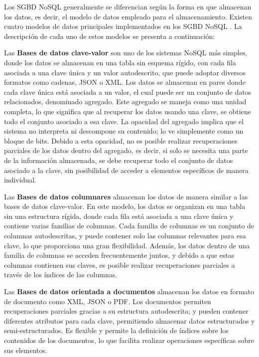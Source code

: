 Los SGBD NoSQL generalmente se diferencian según la forma en que almacenan los datos, 
es decir, el modelo de datos empleado para el almacenamiento. Existen cuatro modelos 
de datos principales implementados en los SGBD NoSQL \cite{Oliveira2021}. La descripción de 
cada uno de estos modelos se presenta a continuación:

Las \textbf{Bases de datos clave-valor} son uno de los sistemas NoSQL más simples, 
donde los datos se almacenan en una tabla sin esquema rígido, con cada fila asociada 
a una clave única y un valor autodescrito, que puede adoptar diversos formatos como 
cadenas, JSON o XML. Los datos se almacenan en pares donde cada clave única está 
asociada a un valor, el cual puede ser un conjunto de datos relacionados, denominado 
agregado. Este agregado se maneja como una unidad completa, lo que significa que al 
recuperar los datos usando una clave, se obtiene todo el conjunto asociado a esa clave. 
La opacidad del agregado implica que el sistema no interpreta ni descompone su contenido; 
lo ve simplemente como un bloque de bits. Debido a esta opacidad, no es posible realizar 
recuperaciones parciales de los datos dentro del agregado, es decir, si solo se necesita 
una parte de la información almacenada, se debe recuperar todo el conjunto de datos 
asociado a la clave, sin posibilidad de acceder a elementos específicos de manera individual.

Las \textbf{Bases de datos columnares} almacenan los datos de manera similar a las 
bases de datos clave-valor. En este modelo, los datos se organizan en una tabla 
sin una estructura rígida, donde cada fila está asociada a una clave única y contiene 
varias familias de columnas. Cada familia de columnas es un conjunto de columnas autodescritas, 
y puede contener solo las columnas relevantes para esa clave, lo que proporciona una gran 
flexibilidad. Además, los datos dentro de una familia de columnas se acceden frecuentemente 
juntos, y debido a que estas columnas contienen sus claves, es posible realizar recuperaciones 
parciales a través de los índices de las columnas.

Las \textbf{Bases de datos orientada a documentos} almacenan los datos en formato de 
documento como XML, JSON o PDF. Los documentos permiten recuperaciones parciales gracias a su 
estructura autodescrita; y pueden contener diferentes atributos para cada clave, permitiendo 
almacenar datos estructurados y semi-estructurados. Es flexible y permite la definición 
de índices sobre los contenidos de los documentos, lo que facilita realizar operaciones 
específicas sobre sus elementos.

